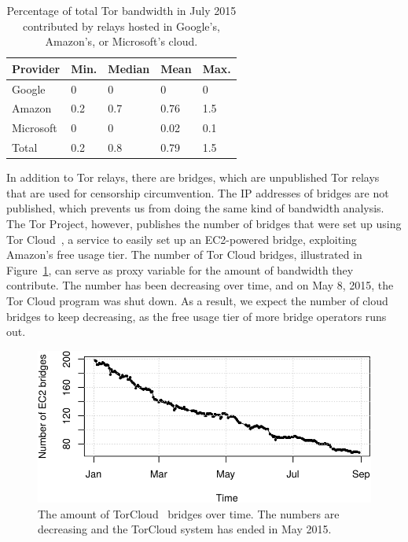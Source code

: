 \begin{table}[t]
	\centering
	\begin{tabular}{lllll}
	\textbf{Provider} & \textbf{Min.} & \textbf{Median} & \textbf{Mean} & \textbf{Max.} \\
	\hline
	Google & 0 & 0 & 0 & 0 \\
	Amazon & 0.2 & 0.7 & 0.76 & 1.5 \\
	Microsoft & 0 & 0 & 0.02 & 0.1 \\
	\hline
	Total & 0.2 & 0.8 & 0.79 & 1.5 \\
	\end{tabular}
	\caption{Percentage of total Tor bandwidth in July 2015 contributed by
	relays hosted in Google's, Amazon's, or Microsoft's cloud.}
	\label{tab:bwfraction}
\end{table}

In addition to Tor relays, there are bridges, which are unpublished Tor relays
that are used for censorship circumvention.  The IP addresses of bridges are
not published, which prevents us from doing the same kind of bandwidth
analysis.  The Tor Project, however, publishes the number of bridges that were
set up using Tor Cloud~\cite{torcloud}, a service to easily set up an
EC2-powered bridge, exploiting Amazon's free usage tier.  The number of Tor
Cloud bridges, illustrated in Figure~\ref{fig:cloudbridges}, can serve as proxy
variable for the amount of bandwidth they contribute.  The number has been
decreasing over time, and on May 8, 2015, the Tor Cloud program was shut down.
As a result, we expect the number of cloud bridges to keep decreasing, as the
free usage tier of more bridge operators runs out.

\begin{figure}[t]
	\centering
	\includegraphics[width=\linewidth]{diagrams/torcloud.pdf}
	\caption{The amount of TorCloud~\cite{torcloud} bridges over time.  The
	numbers are decreasing and the TorCloud system has ended in May 2015.}
	\label{fig:cloudbridges}
\end{figure}
